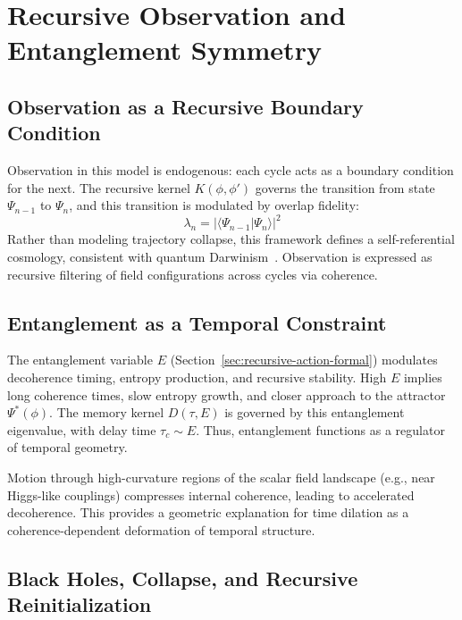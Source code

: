 \section{Recursive Observation and Entanglement Symmetry}
\label{sec:recursive-observation}

\subsection{Observation as a Recursive Boundary Condition}

Observation in this model is endogenous: each cycle acts as a boundary condition for the next. The recursive kernel \( K(\phi, \phi') \) governs the transition from state \( \Psi_{n-1} \) to \( \Psi_n \), and this transition is modulated by overlap fidelity:
\[
\lambda_n = |\langle \Psi_{n-1} | \Psi_n \rangle|^2
\]
Rather than modeling trajectory collapse, this framework defines a self-referential cosmology, consistent with quantum Darwinism~\cite{zurek_environment-induced_2003,zurek_quantum_2009}. Observation is expressed as recursive filtering of field configurations across cycles via coherence.

\subsection{Entanglement as a Temporal Constraint}

The entanglement variable \( E \) (Section~\ref{sec:recursive-action-formal}) modulates decoherence timing, entropy production, and recursive stability. High \( E \) implies long coherence times, slow entropy growth, and closer approach to the attractor \( \Psi^*(\phi) \). The memory kernel \( D(\tau, E) \) is governed by this entanglement eigenvalue, with delay time \( \tau_c \sim E \). Thus, entanglement functions as a regulator of temporal geometry.

Motion through high-curvature regions of the scalar field landscape (e.g., near Higgs-like couplings) compresses internal coherence, leading to accelerated decoherence. This provides a geometric explanation for time dilation as a coherence-dependent deformation of temporal structure.

\subsection{Black Holes, Collapse, and Recursive Reinitialization}

